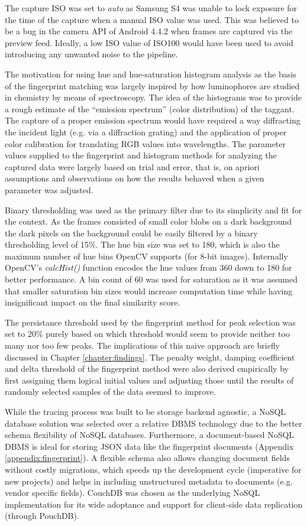 \documentclass[thesis.tex]{subfiles}
\begin{document}
The capture ISO was set to \emph{auto} as Samsung S4 was unable to lock exposure for the time of the capture when a manual ISO value was used. This was believed to be a bug in the camera API of Android 4.4.2 when frames are captured via the preview feed. Ideally, a low ISO value of ISO100 would have been used to avoid introducing any unwanted noise to the pipeline.

The motivation for using hue and hue-saturation histogram analysis as the basis of the fingerprint matching was largely inspired by how luminophores are studied in chemistry by means of spectroscopy. The idea of the histograms was to provide a rough estimate of the ``emission spectrum'' (color distribution) of the taggant. The capture of a proper emission spectrum would have required a way diffracting the incident light (e.g. via a diffraction grating) and the application of proper color calibration for translating RGB values into wavelengths. The parameter values supplied to the fingerprint and histogram methods for analyzing the captured data were largely based on trial and error, that is, on apriori assumptions and observations on how the results behaved when a given parameter was adjusted.

Binary thresholding was used as the primary filter due to its simplicity and fit for the context. As the frames consisted of small color blobs on a dark background the dark pixels on the background could be easily filtered by a binary thresholding level of 15\%. The hue bin size was set to 180, which is also the maximum number of hue bins OpenCV supports (for 8-bit images). Internally OpenCV's \emph{calcHist()} function encodes the hue values from 360 down to 180 for better performance. A bin count of 60 was used for saturation as it was assumed that smaller saturation bin sizes would increase computation time while having insignificant impact on the final similarity score.

The persistance threshold used by the fingerprint method for peak selection was set to 20\% purely based on which threshold would seem to provide neither too many nor too few peaks. The implications of this naive approach are briefly discussed in Chapter \ref{chapter:findings}. The penalty weight, damping coefficient and delta threshold of the fingerprint method were also derived empirically by first assigning them logical initial values and adjusting those until the results of randomly selected samples of the data seemed to improve.

While the tracing process was built to be storage backend agnostic, a NoSQL database solution was selected over a relative DBMS technology due to the better schema flexibility of NoSQL databases. Furthermore, a document-based NoSQL DBMS is ideal for storing JSON data like the fingerprint documents (Appendix \ref{appendix:fingerprint}). A flexible schema also allows changing document fields without costly migrations, which speeds up the development cycle (imperative for new projects) and helps in including unstructured metadata to documents (e.g. vendor specific fields). CouchDB was chosen as the underlying NoSQL implementation for its wide adoptance and support for client-side data replication (through PouchDB).
\end{document}
